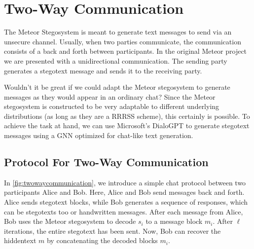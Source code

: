 \chapter{Two-Way Communication}
\label{chap:twowaycommunication}

The Meteor Stegosystem is meant to generate text messages to send via an unsecure channel.
Usually, when two parties communicate, the communication consists of a back and forth between participants.
In the original Meteor project we are presented with a unidirectional communication.
The sending party generates a stegotext message and sends it to the receiving party.

Wouldn't it be great if we could adapt the Meteor stegosystem to generate messages as they would appear in an ordinary chat?
Since the Meteor stegosystem is constructed to be very adaptable to different underlying distributions (as long as they are a RRRSS scheme), this certainly is possible.
To achieve the task at hand, we can use Microsoft's DialoGPT \cite{Zhang2020} to generate stegotext messages using a GNN optimized for chat-like text generation.

\section{Protocol For Two-Way Communication}

In \autoref{fig:twowaycommunication}, we introduce a simple chat protocol between two participants Alice and Bob.
Here, Alice and Bob send messages back and forth.
Alice sends stegotext blocks, while Bob generates a sequence of responses, which can be stegotexts too or handwritten messages.
After each message from Alice, Bob uses the Meteor stegosystem to decode $s_i$ to a message block $m_i$.
After $\ell$ iterations, the entire stegotext has been sent.
Now, Bob can recover the hiddentext $m$ by concatenating the decoded blocks $m_i$.


